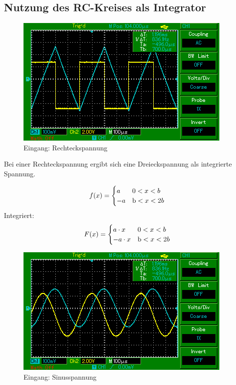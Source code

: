 \subsection{Nutzung des RC-Kreises als Integrator}

\begin{figure}[H]
  \centering
  \includegraphics{MAP001.png}
  \caption{Eingang: Rechteckspannung}
  \label{fig:Rechteckspannung}
\end{figure}

Bei einer Rechteckspannung ergibt sich eine Dreieckspannung als integrierte Spannung.

\begin{equation*}
  f(x) =
  \begin{cases}
    a & \text 0 < x < b \\
    -a & \text b < x < 2b \\
  \end{cases}
\end{equation*}
Integriert:
\begin{equation*}
  F(x) =
  \begin{cases}
    a \cdot x & \text 0 < x < b \\
    -a \cdot x & \text b < x < 2b \\
  \end{cases}
\end{equation*}

\begin{figure}[H]
  \centering
  \includegraphics{MAP002.png}
  \caption{Eingang: Sinusspannung }
  \label{fig:Sinusspannung}
\end{figure}


